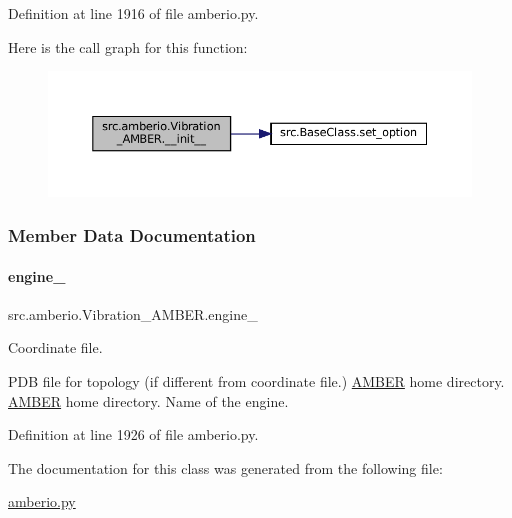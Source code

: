 Definition at line 1916 of file amberio.\+py.

Here is the call graph for this function\+:
\nopagebreak
\begin{figure}[H]
\begin{center}
\leavevmode
\includegraphics[width=350pt]{classsrc_1_1amberio_1_1Vibration__AMBER_a9519126753f991390e51a25340db28d8_cgraph}
\end{center}
\end{figure}


\subsubsection{Member Data Documentation}
\mbox{\label{classsrc_1_1amberio_1_1Vibration__AMBER_a513264003da327a62ec7fa5ad8e8ae30}} 
\paragraph{\texorpdfstring{engine\+\_\+}{engine\_}}
{\footnotesize\ttfamily src.\+amberio.\+Vibration\+\_\+\+A\+M\+B\+E\+R.\+engine\+\_\+}



Coordinate file. 

P\+DB file for topology (if different from coordinate file.) \hyperlink{classsrc_1_1amberio_1_1AMBER}{A\+M\+B\+ER} home directory. \hyperlink{classsrc_1_1amberio_1_1AMBER}{A\+M\+B\+ER} home directory. Name of the engine. 

Definition at line 1926 of file amberio.\+py.



The documentation for this class was generated from the following file\+:\begin{DoxyCompactItemize}
\item 
\hyperlink{amberio_8py}{amberio.\+py}\end{DoxyCompactItemize}
